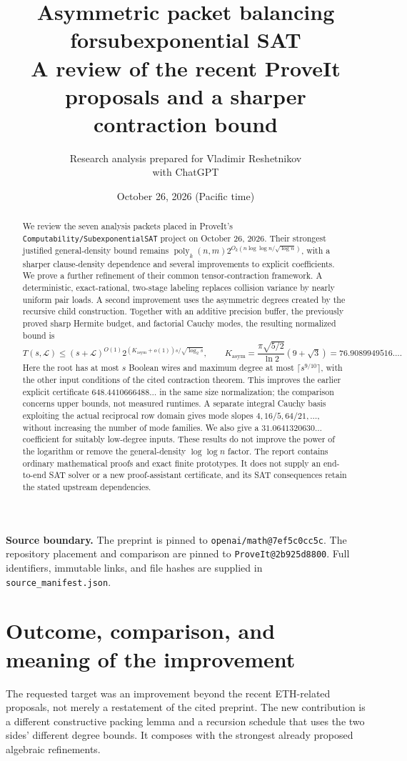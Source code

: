 \documentclass[11pt,letterpaper]{article}
\title{Asymmetric packet balancing for\newline subexponential SAT\\[4pt]\large A review of the recent ProveIt proposals and a sharper contraction bound}
\author{Research analysis prepared for Vladimir Reshetnikov\\\small with ChatGPT}
\date{October 26, 2026 (Pacific time)}
\theoremstyle{remark}\newtheorem{remark}[theorem]{Remark}
\newcommand{\poly}{\operatorname{poly}}
\newcommand{\KL}{K_{\mathrm{asym}}}
\begin{document}
\maketitle
\begin{abstract}
We review the seven analysis packets placed in ProveIt's
\texttt{Computability/SubexponentialSAT} project on October 26, 2026.
Their strongest justified general-density bound remains
$\poly_k(n,m)2^{O_k(n\log\log n/\sqrt{\log n})}$, with a sharper
clause-density dependence and several improvements to explicit coefficients.
We prove a further refinement of their common tensor-contraction framework.
A deterministic, exact-rational, two-stage labeling replaces collision
variance by nearly uniform pair loads. A second improvement uses the
asymmetric degrees created by the recursive child construction. Together
with an additive precision buffer, the previously proved sharp Hermite
budget, and factorial Cauchy modes, the resulting normalized bound is
\[
 T(s,\mathcal L)\le(s+\mathcal L)^{O(1)}
 2^{(\KL+o(1))s/\sqrt{\log_2s}},\qquad
 \KL=\frac{\pi\sqrt{5/2}}{\ln2}(9+\sqrt3)
 =76.9089949516\ldots .
\]
Here the root has at most $s$ Boolean wires and maximum degree at most
$\lceil s^{9/10}\rceil$, with the other input conditions of the cited
contraction theorem. This improves the earlier explicit certificate
$648.4410666488\ldots$ in the same size normalization; the comparison
concerns upper bounds, not measured runtimes. A separate integral Cauchy
basis exploiting the actual reciprocal row domain gives mode slopes
$4,16/5,64/21,\ldots$, without increasing the number of mode families.
We also give a $31.0641320630\ldots$ coefficient for suitably low-degree
inputs. These results do not improve the power of the logarithm or remove
the general-density $\log\log n$ factor. The report contains ordinary
mathematical proofs and exact finite prototypes. It does not supply an
end-to-end SAT solver or a new proof-assistant certificate, and its SAT
consequences retain the stated upstream dependencies.
\end{abstract}
\noindent\textbf{Source boundary.} The preprint is pinned to
\texttt{openai/math@7ef5c0cc5c}. The repository placement and comparison
are pinned to \texttt{ProveIt@2b925d8800}. Full identifiers, immutable links,
and file hashes are supplied in \texttt{source\_manifest.json}.
\newpage
\tableofcontents
\newpage

\section{Outcome, comparison, and meaning of the improvement}
\label{sec:outcome}
The requested target was an improvement beyond the recent ETH-related
proposals, not merely a restatement of the cited preprint. The new
contribution is a different constructive packing lemma and a recursion
schedule that uses the two sides' different degree bounds. It composes
with the strongest already proposed algebraic refinements.
\end{document}
